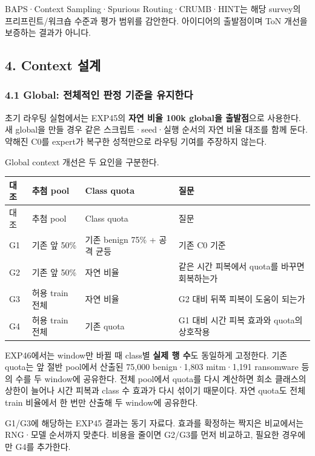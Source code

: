 BAPS·Context Sampling·Spurious Routing·CRUMB·HINT는 해당 survey의 프리프린트/\allowbreak{}워크숍 수준과 평가 범위를 감안한다. 아이디어의 출발점이며 ToN 개선을 보증하는 결과가 아니다.

\subsection{4. Context 설계}
\subsubsection{4.1 Global: 전체적인 판정 기준을 유지한다}
초기 라우팅 실험에서는 EXP45의 \textbf{자연 비율 100k global을 출발점}으로 사용한다. 새 global을 만들 경우 같은 스크립트·seed·실행 순서의 자연 비율 대조를 함께 둔다. 약해진 C0를 expert가 복구한 성적만으로 라우팅 기여를 주장하지 않는다.

Global context 개선은 두 요인을 구분한다.

\begingroup
\footnotesize
\begin{longtable}{>{\raggedright\arraybackslash}p{}>{\raggedright\arraybackslash}p{}>{\raggedright\arraybackslash}p{}>{\raggedright\arraybackslash}p{}}
\toprule
대조 & 추첨 pool & Class quota & 질문 \\ \midrule
\endfirsthead
대조 & 추첨 pool & Class quota & 질문 \\ \midrule
\endhead
{}G1 & 기존 앞 50\% & 기존 benign 75\% +\allowbreak{} 공격 균등 & 기존 C0 기준 \\
{}G2 & 기존 앞 50\% & 자연 비율 & 같은 시간 피복에서 quota를 바꾸면 회복하는가 \\
{}G3 & 허용 train 전체 & 자연 비율 & G2 대비 뒤쪽 피복이 도움이 되는가 \\
{}G4 & 허용 train 전체 & 기존 quota & G1 대비 시간 피복 효과와 quota의 상호작용 \\
\bottomrule
\end{longtable}
\endgroup
EXP46에서는 window만 바뀔 때 class별 \textbf{실제 행 수}도 동일하게 고정한다. 기존 quota는 앞 절반 pool에서 산출된 75,000 benign·1,803 mitm·1,191 ransomware 등의 수를 두 window에 공유한다. 전체 pool에서 quota를 다시 계산하면 희소 클래스의 상한이 늘어나 시간 피복과 class 수 효과가 다시 섞이기 때문이다. 자연 quota도 전체 train 비율에서 한 번만 산출해 두 window에 공유한다.

G1/\allowbreak{}G3에 해당하는 EXP45 결과는 동기 자료다. 효과를 확정하는 짝지은 비교에서는 RNG·모델 순서까지 맞춘다. 비용을 줄이면 G2/\allowbreak{}G3를 먼저 비교하고, 필요한 경우에만 G4를 추가한다.

